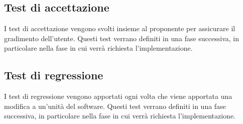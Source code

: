 \subsection{Test di accettazione}
    I test di accettazione vengono svolti insieme al proponente per assicurare il gradimento dell'utente. Questi test verrano definiti in una fase successiva, in particolare nella fase in cui verrà richiesta l'implementazione.
    
\subsection{Test di regressione}
    I test di regressione vengono apportati ogni volta che viene apportata una modifica a un'unità del software. Questi test verrano definiti in una fase successiva, in particolare nella fase in cui verrà richiesta l'implementazione.


